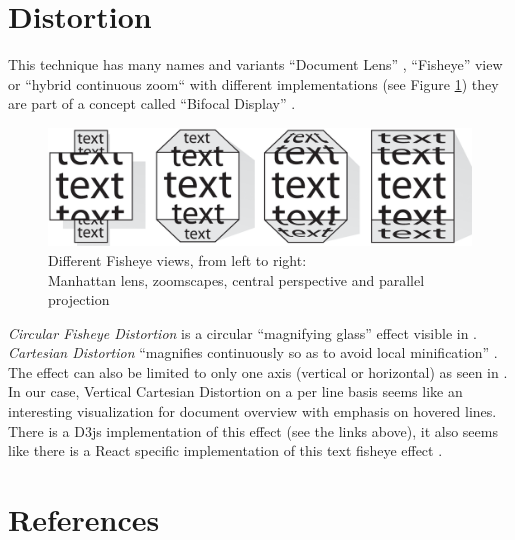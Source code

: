 \documentclass[12pt,a4paper,british]{report}
\begin{document}
\section*{Distortion}

This technique has many names and variants ``Document Lens'' \autocite{robertsonDocumentLens1993}, ``Fisheye'' view \autocite{greenbergFisheyeTextEditor1996} or ``hybrid continuous zoom`` \autocite{bartramContinuousZoomConstrained1995} with different implementations (see Figure \ref{fig:fisheyes}) they are part of a concept called ``Bifocal Display'' \autocite{apperleyBifocalDisplay}.

\begin{figure}[H]
  \centering
  \includegraphics[width=\textwidth]{static/different-fisheyes.png}
  \caption{Different Fisheye views, from left to right: \\ Manhattan lens, zoomscapes, central perspective and parallel projection \\ \protect\autocite{baudischFishnetFisheyeWeb2004}}
  \label{fig:fisheyes}
\end{figure}

\textit{Circular Fisheye Distortion} is a circular ``magnifying glass'' effect visible in \textcite{bostockFisheyeGrid2019}. \textit{Cartesian Distortion} ``magnifies continuously so as to avoid local minification'' \autocite{bostockFisheyeDistortion2012}. The effect can also be limited to only one axis (vertical or horizontal) as seen in \textcite{pstuffaCartesianFisheyeDistortion2019}. In our case, Vertical Cartesian Distortion on a per line basis seems like an interesting visualization for document overview with emphasis on hovered lines. There is a D3js implementation of this effect (see the links above), it also seems like there is a React specific implementation of this text fisheye effect \autocite{zhongVincentdchanReactfisheye2019}.




\newpage


\section*{References}

\printbibliography[heading=none]

\vspace*{\fill}
\end{document}

